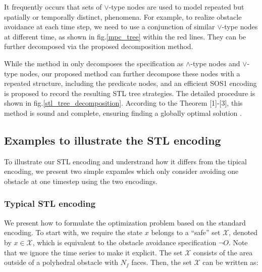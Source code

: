 \documentclass[a4paper]{report}
\begin{document}
It frequently occurs that sets of $\vee$-type nodes are used to model repeated but spatially or temporally distinct, phenomena. For example, to realize obstacle avoidance at each time step, we need to use a conjunction of similar $\vee$-type nodes at different time, as shown in fig.\ref{mpc_tree} within the red lines. They can be further decomposed via the proposed decomposition method.

While the method in \cite{kurtz2022mixed} only decomposes the specification as $\wedge $-type nodes and $\vee$-type nodes, our proposed method can further decompose these nodes with a repeated structure, including the predicate nodes, and an efficient SOS1 encoding is proposed to record the resulting STL tree strategies. The detailed procedure is shown in fig.\ref{stl_tree_decomposition}. According to the Theorem [1]-[3], this method is sound and complete, ensuring finding a globally optimal solution \cite[]{kurtz2022mixed}.

\subsection{Examples to illustrate the STL encoding} 

To illustrate our STL encoding and understrand how it differs from the tipical encoding, we present two simple expamles which only consider avoiding one obstacle at one timestep using the two encodings.

\subsubsection*{Typical STL encoding}

We present how to formulate the optimization problem based on the standard encoding. To start with, we require the state $x$ belongs to a “safe” set $\mathcal{X}$, denoted by $x \in \mathcal{X}$, which is equivalent to the obstacle avoidance specification $\lnot O$. Note that we ignore the time series to make it explicit. The set $\mathcal{X}$ consists of the area outside of a polyhedral obstacle with $N_f$ faces. Then, the set $\mathcal{X}$ can be written as:
\end{document}
